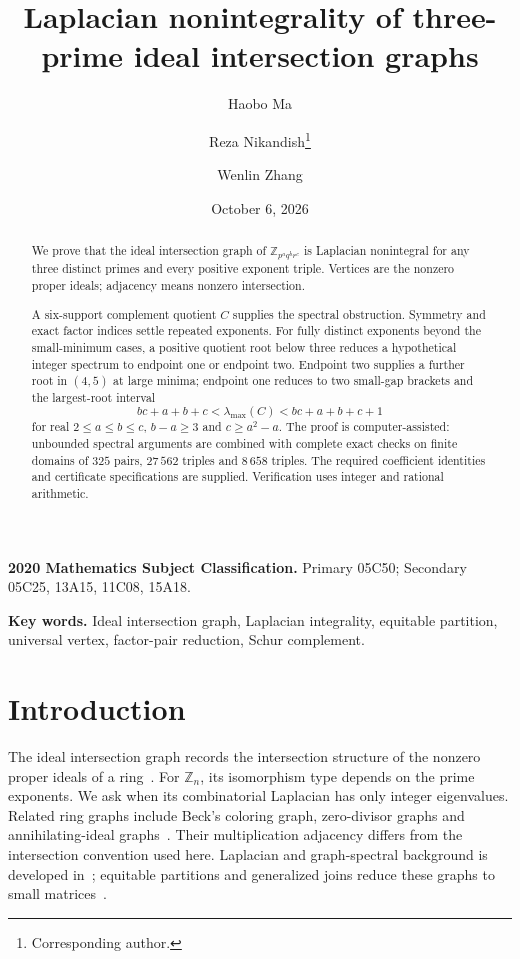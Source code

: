 \documentclass[11pt]{article}
\title{Laplacian nonintegrality of three-prime ideal intersection graphs}
\author{Haobo Ma \and Reza Nikandish\thanks{Corresponding author.} \and Wenlin Zhang}
\date{October 6, 2026}
\theoremstyle{remark}
\begin{document}
\maketitle
\begin{abstract}
We prove that the ideal intersection graph of
$\mathbb Z_{p^a q^b r^c}$ is Laplacian nonintegral for any three distinct
primes and every positive exponent triple. Vertices are the nonzero
proper ideals; adjacency means nonzero intersection.

A six-support complement quotient $C$ supplies the spectral obstruction.
Symmetry and exact factor indices settle repeated exponents. For fully
distinct exponents beyond the small-minimum cases, a positive quotient
root below three reduces a hypothetical integer spectrum to endpoint
one or endpoint two. Endpoint two supplies a further root in $(4,5)$
at large minima; endpoint one reduces to two small-gap brackets and
the largest-root interval
\[
 bc+a+b+c<\lambda_{\max}(C)<bc+a+b+c+1
\]
for real $2\leq a\leq b\leq c$, $b-a\geq3$ and $c\geq a^2-a$.
The proof is computer-assisted: unbounded spectral arguments are combined
with complete exact checks on finite domains of $325$ pairs,
$27\,562$ triples and $8\,658$ triples. The required coefficient identities
and certificate specifications are supplied. Verification uses integer
and rational arithmetic.
\end{abstract}
\noindent\textbf{2020 Mathematics Subject Classification.}
Primary 05C50; Secondary 05C25, 13A15, 11C08, 15A18.

\noindent\textbf{Key words.} Ideal intersection graph, Laplacian integrality,
equitable partition, universal vertex, factor-pair reduction,
Schur complement.

\section{Introduction}
The ideal intersection graph records the intersection structure of the
nonzero proper ideals of a ring~\cite{intersection}. For $\mathbb Z_n$,
its isomorphism type depends on the prime exponents. We ask when its
combinatorial Laplacian has only integer eigenvalues.
Related ring graphs include Beck's coloring graph, zero-divisor graphs
and annihilating-ideal graphs~\cite{beck,anderson,behboodi1,behboodi2,aalipour}.
Their multiplication adjacency differs from the intersection convention
used here. Laplacian and graph-spectral background is developed
in~\cite{fiedler,grone,merris,cvetkovic,brouwer}; equitable partitions
and generalized joins reduce these graphs to small matrices~\cite{godsilroyle,cardoso}.
\end{document}
